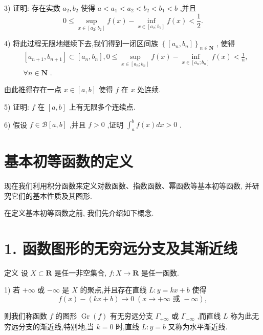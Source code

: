 3) 证明: 存在实数 ${a}_{2},{b}_{2}$ 使得 $a < {a}_{1} < {a}_{2} < {b}_{2} < {b}_{1} < b$ ,并且
$$0 \leq  \mathop{\sup }\limits_{{x \in  \left\lbrack  {{a}_{2};{b}_{2}}\right\rbrack  }}f\left( x\right)  - \mathop{\inf }\limits_{{x \in  \left\lbrack  {{a}_{2};{b}_{2}}\right\rbrack  }}f\left( x\right)  < \frac{1}{2}.$$

4) 将此过程无限地继续下去,我们得到一闭区间族 ${\left\{  \left\lbrack  {a}_{n},{b}_{n}\right\rbrack  \right\}  }_{n \in  \mathbf{N}}$ , 使得
\begin{align*}
	&\left\lbrack  {{a}_{n + 1},{b}_{n + 1}}\right\rbrack   \subset  \left\lbrack  {{a}_{n},{b}_{n}}\right\rbrack  ,0 \leq  \mathop{\sup }\limits_{{x \in  \left\lbrack  {{a}_{n};{b}_{n}}\right\rbrack  }}f\left( x\right)  - \mathop{\inf }\limits_{{x \in  \left\lbrack  {{a}_{n};{b}_{n}}\right\rbrack  }}f\left( x\right)  < \frac{1}{n},\\
	&\forall n \in  \mathbf{N}\text{ . }
\end{align*}

由此推得存在一点 $x \in  \left\lbrack  {a,b}\right\rbrack$ 使得 $f$ 在 $x$ 处连续.

5) 证明: $f$ 在 $\left\lbrack  {a,b}\right\rbrack$ 上有无限多个连续点.

6) 假设 $f \in  \mathcal{B}\left\lbrack  {a,b}\right\rbrack$ ,并且 $f > 0$ ,证明 ${\int }_{a}^{b}f\left( x\right) {dx} > 0$ .

\section{基本初等函数的定义}

现在我们利用积分函数来定义对数函数、指数函数、幂函数等基本初等函数, 并研究它们的基本性质及其图形.

在定义基本初等函数之前, 我们先介绍如下概念.

\section*{1. 函数图形的无穷远分支及其渐近线}

定义 设 $X \subset  \mathbf{R}$ 是任一非空集合, $f : X \rightarrow  \mathbf{R}$ 是任一函数.

1) 若 $+ \infty$ 或 $- \infty$ 是 $X$ 的聚点,并且存在直线 $L : y = {kx} + b$ 使得
$$f\left( x\right)  - \left( {{kx} + b}\right)  \rightarrow  0\;\left( {x \rightarrow   + \infty \text{ 或 } - \infty }\right) ,$$

则我们称函数 $f$ 的图形 $\operatorname{Gr}\left( f\right)$ 有无穷远分支 ${\Gamma }_{+\infty }$ 或 ${\Gamma }_{-\infty }$ ,而直线 $L$ 称为此无穷远分支的渐近线,特别地,当 $k = 0$ 时,直线 $L : y = b$ 又称为水平渐近线.

